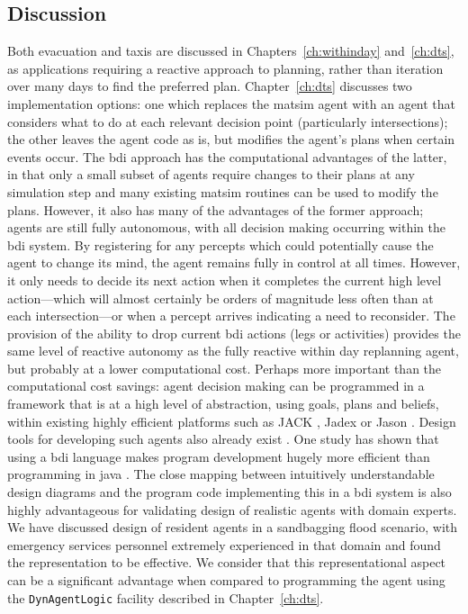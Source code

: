 \subsection{Discussion}
Both evacuation and taxis are discussed in Chapters~\ref{ch:withinday} and~\ref{ch:dts}, 
as applications requiring a reactive approach to planning,
rather than iteration over many days to find the preferred plan. 
 Chapter~\ref{ch:dts} discusses two implementation options: one
which replaces the \gls{matsim} agent with an agent that considers what to
do at each relevant decision point (particularly intersections);
the other leaves the agent code as is, but modifies the agent's
plans when certain events occur. The \gls{bdi} approach has the computational
advantages of the latter, in that only a small subset of agents
require changes to their plans at any simulation step and many
existing \gls{matsim} routines can be used to modify the plans. However, it
also has many of the advantages of the former approach;
agents are still fully autonomous, with all decision making occurring
within the \gls{bdi} system. By registering for any percepts which could
potentially cause the agent to change its mind, the agent remains
fully in control at all times. However, it only needs to decide its next action
when it completes the current high level action---which will almost
certainly be orders of magnitude less often than at each intersection---or when 
a percept arrives indicating a need to reconsider. The
provision of the ability to drop current \gls{bdi} actions (legs or
activities) provides the same level of reactive autonomy as the fully
reactive within day replanning agent, but probably at a
lower computational cost. 
%
Perhaps more important than the computational cost savings: 
agent decision making can be programmed in a framework
that is at a high level of abstraction, using goals, plans and
beliefs, within existing highly efficient platforms such as JACK
\citep{jackref}, Jadex \citep{jadex2005} or Jason \citep{jason}. Design
tools for developing such agents also already exist
\citep{prometheusbook}. One study has shown that using a \gls{bdi} language
makes program development hugely more efficient than programming in
\gls{java} \citep{benfield}. The close mapping between intuitively
understandable design diagrams and the program code implementing
this in a \gls{bdi} system is also highly advantageous for validating
design of realistic agents with domain experts. We have discussed
design of resident agents in a sandbagging flood scenario, with
emergency services personnel extremely experienced in that
domain and found the representation to be effective. We consider that
this representational aspect can be a significant advantage when
compared to programming the agent using the \lstinline{DynAgentLogic}
facility described in Chapter~\ref{ch:dts}.









